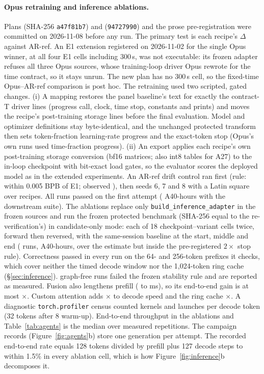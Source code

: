 \documentclass{article}
\begin{document}
\paragraph{Opus retraining and inference ablations.} Plans  (SHA-256 \texttt{a47f81b7}) and  (\texttt{94727990}) and the prose pre-registration  were committed on 2026-11-08 before any run. The primary test is each recipe's $\Delta$ against AR-ref. An E1 extension registered on 2026-11-02 for the single Opus winner, at all four E1 cells including 300\,s, was not executable: its frozen adapter refuses all three Opus sources, whose training-loop driver Opus rewrote for the time contract, so it stays unrun. The new plan has no 300\,s cell, so the fixed-time Opus--AR-ref comparison is post hoc. The retraining used two scripted, gated changes. (i) A mapping restores the panel baseline's text for exactly the contract-T driver lines (progress call, clock, time stop, constants and prints) and moves the recipe's post-training storage lines before the final evaluation. Model and optimizer definitions stay byte-identical, and the unchanged protected transform then sets token-fraction learning-rate progress and the exact-token stop (Opus's own runs used time-fraction progress). (ii) An export applies each recipe's own post-training storage conversion (bf16 matrices; also int8 tables for A27) to the in-loop checkpoint with bit-exact load gates, so the evaluator scores the deployed model as in the extended experiments. An AR-ref drift control ran first (rule: within 0.005 BPB of E1; observed \CRMTDriftAbs), then seeds 6, 7 and 8 with a Latin square over recipes. All \CRMTRuns{} runs passed on the first attempt (\CRMTHours{} A40-hours with the downstream suite). The ablations replace only \texttt{build\_inference\_adapter} in the frozen sources and run the frozen protected benchmark (SHA-256 equal to the re-verification's) in candidate-only mode: each of 18 checkpoint--variant cells twice, forward then reversed, with the same-session baseline at the start, middle and end (\CRIARuns{} runs, \CRIAHours{} A40-hours, over the estimate but inside the pre-registered $2\times$ stop rule). Correctness passed in every run on the 64- and 256-token prefixes it checks, which cover neither the timed decode window nor the 1{,}024-token ring cache (\S\ref{sec:inference}). \CRIAUnstable{} graph-free runs failed the frozen stability rule and are reported as measured. Fusion also lengthens prefill (\CRThreePreNoFusion{} to \CRThreePreOpus{} ms), so its end-to-end gain is at most \CRIAFusionEtoEHi$\times$. Custom attention adds \CRIAAttnLo$\times$ to decode speed and the ring cache \CRIARingLo$\times$. A diagnostic \texttt{torch.profiler} census counted kernels and launches per decode token (32 tokens after 8 warm-up). End-to-end throughput in the ablations and Table~\ref{tab:agents} is the median over measured repetitions. The campaign records (Figure~\ref{fig:agents}b) store one generation per attempt. The recorded end-to-end rate equals 128 tokens divided by prefill plus 127 decode steps to within 1.5\% in every ablation cell, which is how Figure~\ref{fig:inference}b decomposes it.
\end{document}
